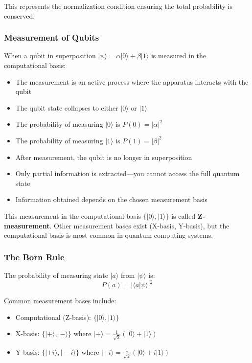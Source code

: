 \documentclass{article}
\begin{document}
This represents the normalization condition ensuring the total probability is conserved.

\subsubsection*{Measurement of Qubits}

When a qubit in superposition $|\psi\rangle = \alpha|0\rangle + \beta|1\rangle$ is measured in the computational basis:

\begin{itemize}
    \item The measurement is an active process where the apparatus interacts with the qubit
    \item The qubit state collapses to either $|0\rangle$ or $|1\rangle$
    \item The probability of measuring $|0\rangle$ is $P(0) = |\alpha|^2$
    \item The probability of measuring $|1\rangle$ is $P(1) = |\beta|^2$
    \item After measurement, the qubit is no longer in superposition
    \item Only partial information is extracted—you cannot access the full quantum state
    \item Information obtained depends on the chosen measurement basis
\end{itemize}

This measurement in the computational basis $\{|0\rangle, |1\rangle\}$ is called \textbf{Z-measurement}. Other measurement bases exist (X-basis, Y-basis), but the computational basis is most common in quantum computing systems.

\subsubsection*{The Born Rule}
The probability of measuring state $|a\rangle$ from $|\psi\rangle$ is:
$$P(a) = |\langle a|\psi\rangle|^2$$

Common measurement bases include:
\begin{itemize}
    \item Computational (Z-basis): $\{|0\rangle, |1\rangle\}$
    \item X-basis: $\{|+\rangle, |-\rangle\}$ where $|+\rangle = \frac{1}{\sqrt{2}}(|0\rangle + |1\rangle)$
    \item Y-basis: $\{|+i\rangle, |-i\rangle\}$ where $|+i\rangle = \frac{1}{\sqrt{2}}(|0\rangle + i|1\rangle)$
\end{itemize}
\end{document}
